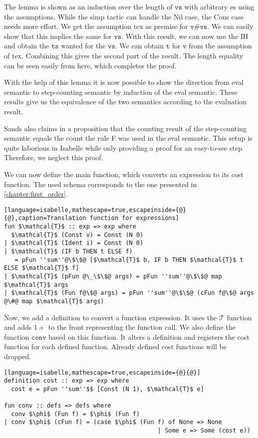 The lemma is shown as an induction over the length of $\texttt{vs}$ with arbitrary es using the assumptions.
While the simp tactic can handle the Nil case, the Cons case needs more effort.
We get the assumption tex as premise for $\texttt{v\#vs}$.
We can easily show that this implies the same for $\texttt{vs}$.
With this result, we can now use the IH and obtain the $\texttt{ts}$ wanted for the $\texttt{vs}$.
We can obtain $\texttt{t}$ for $\texttt{v}$ from the assumption of tex.
Combining this gives the second part of the result.
The length equality can be seen easily from here, which completes the proof.

With the help of this lemma it is now possible to show the direction from eval semantic to step-counting semantic by induction of the eval semantic.
These results give us the equivalence of the two semantics according to the evaluation result.

Sands also claims in a proposition that the counting result of the step-counting semantic equals the count the rule F was used in the eval semantic.
This setup is quite laborious in Isabelle while only providing a proof for an easy-to-see step.
Therefore, we neglect this proof.

We can now define the main function, which converts an expression to its cost function.
The used schema corresponds to the one presented in \autoref{chapter:first_order}.
\begin{lstlisting}[language=isabelle,mathescape=true,escapeinside={@}{@},caption=Translation function for expressions]
fun $\mathcal{T}$ :: exp => exp where
  $\mathcal{T}$ (Const v) = Const (N 0)
| $\mathcal{T}$ (Ident i) = Const (N 0)
| $\mathcal{T}$ (IF b THEN t ELSE f)
   = pFun ''sum''@\$\$@ [$\mathcal{T}$ b, IF b THEN $\mathcal{T}$ t ELSE $\mathcal{T}$ f]
| $\mathcal{T}$ (pFun @\_\$\$@ args) = pFun ''sum''@\$\$@ map $\mathcal{T}$ args
| $\mathcal{T}$ (Fun f@\$@ args) = pFun ''sum''@\$\$@ (cFun f@\$@ args @\#@ map $\mathcal{T}$ args)
\end{lstlisting}

Now, we add a definition to convert a function expression.
It uses the $\mathcal{T}$ function and adds $1+$ to the front representing the function call.
We also define the function $\texttt{conv}$ based on this function.
It alters a definition and registers the cost function for each defined function.
Already defined cost functions will be dropped.
\begin{lstlisting}[language=isabelle,mathescape=true,escapeinside={@}{@}]
definition cost :: exp => exp where
  cost e = pFun ''sum''$$ [Const (N 1), $\mathcal{T}$ e]

fun conv :: defs => defs where
  conv $\phi$ (Fun f) = $\phi$ (Fun f)
| conv $\phi$ (cFun f) = (case $\phi$ (Fun f) of None => None
                                           | Some e => Some (cost e))
\end{lstlisting}


